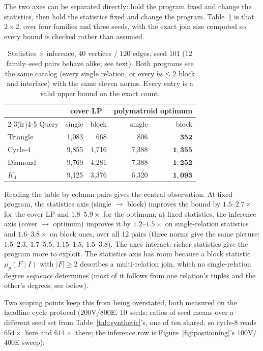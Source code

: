 \documentclass[conference]{IEEEtran}
\newcommand{\block}{F}
\newcommand{\interface}{I}
\begin{document}
The two axes can be separated directly: hold the program fixed and change
the statistics, then hold the statistics fixed and change the program.
Table~\ref{tab:stats-vs-inf} is that $2{\times}2$, over four families and
three seeds, with the exact join size computed so every bound is checked
rather than assumed.

\begin{table}[t]
\centering
\caption{Statistics $\times$ inference, $40$ vertices / $120$ edges,
seed $101$ (12 family--seed pairs behave alike; see text). Both programs
see the same catalog (every single relation, or every $bs{\le}2$
block and interface) with the same eleven norms. Every entry is a valid upper bound on the exact
count.}
\label{tab:stats-vs-inf}
\begin{tabular}{@{}lrrrr@{}}
\toprule
 & \multicolumn{2}{c}{cover LP} & \multicolumn{2}{c}{polymatroid optimum} \\
\cmidrule(lr){2-3}\cmidrule(lr){4-5}
Query & single & block & single & block \\
\midrule
Triangle & 1{,}083 & 668  & 806   & $\mathbf{352}$ \\
Cycle-4  & 9{,}855 & 4{,}716 & 7{,}388 & $\mathbf{1{,}355}$ \\
Diamond  & 9{,}769 & 4{,}281 & 7{,}388 & $\mathbf{1{,}252}$ \\
$K_4$    & 9{,}125 & 3{,}376 & 6{,}320 & $\mathbf{1{,}093}$ \\
\bottomrule
\end{tabular}
\end{table}

Reading the table by column pairs gives the central observation. At fixed
program, the statistics axis (single $\to$ block) improves the bound by
$1.5$--$2.7\times$ for the cover LP and $1.8$--$5.9\times$ for the
optimum; at fixed statistics, the inference axis (cover $\to$ optimum)
improves it by $1.2$--$1.5\times$ on single-relation statistics and
$1.6$--$3.8\times$ on block ones, over all 12 pairs (three norms give the
same picture: $1.5$--$2.3$, $1.7$--$5.5$, $1.15$--$1.5$, $1.5$--$3.8$). The axes interact:
richer statistics give the program more to exploit. The statistics axis
has room because a block statistic $\mu_p(\block \mid \interface)$ with
$|\block| \ge 2$ describes a multi-relation join, which no
single-relation degree \emph{sequence} determines (most of it follows
from one relation's tuples and the other's degrees; see below).

Two scoping points keep this from being overstated, both measured on the
headline cycle protocol ($200$V/$800$E, 10 seeds; ratios of
seed means over a different seed set from
Table~\ref{tab:synthetic}'s, one of ten shared, so cycle-8 reads
$654\times$ here and $614\times$ there; the inference row is Figure~\ref{fig:positioning}'s $100$V/$400$E sweep):
\end{document}

